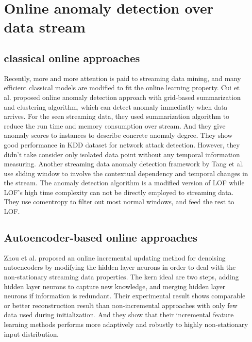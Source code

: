 \section{Online anomaly detection over data stream}
\label{sec: Online anomaly detection over data stream }


\subsection{classical online approaches}
\label{sec:classical online approaches}

Recently, more and more attention is paid to streaming data mining, and many efficient classical models are modified to fit the online learning property. Cui et al. \cite{cui} proposed online anomaly detection approach with grid-based summarization and clustering algorithm, which can detect anomaly immediatly when data arrives. For the seen streaming data, they used summarization algorithm to reduce the run time and memory consumption over stream. And they give anomaly scores to instances to describe concrete anomaly degree. They show good performance in KDD dataset for network attack detection. However, they didn’t take consider only isolated data point without any temporal information measuring. Another streaming data anomaly detection framework by Tang et al. \cite{onlinelof} use sliding window to involve the contextual dependency and temporal changes in the stream. The anomaly detection algorithm is a modified version of LOF while LOF’s high time complexity can not be directly employed to streaming data. They use comentropy to filter out most normal windows, and feed the rest to LOF.

\subsection{Autoencoder-based online approaches}
\label{sec:Autoencoder-based online approaches }

Zhou et al. \cite{online} proposed an online incremental updating method for denoising autoencoders by modifying the hidden layer neurons in order to deal with the non-stationary streaming data properties. The kern ideal are two steps, adding hidden layer neurons to capture new knowledge, and merging hidden layer neurons if information is redundant. Their experimental result shows comparable or better reconstruction result than non-incremental approaches with only few data used during initialization. And they show that their incremental feature learning methods performs more adaptively and robustly to highly non-stationary input distribution.\\

